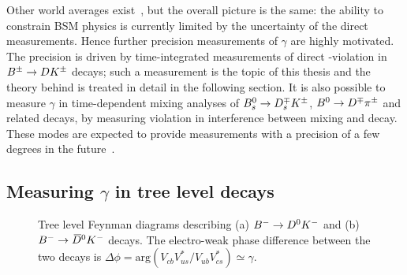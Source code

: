 Other world averages exist~\cite{HFLAV,UTfit-UT}, but the overall picture is the same: the ability to constrain BSM physics is currently limited by the uncertainty of the direct measurements. Hence further precision measurements of $\gamma$ are highly motivated. The precision is driven by time-integrated measurements of direct \CP-violation in ${{B}^\pm}\rightarrow{\ensuremath{D}}{\ensuremath{{K}^\pm}}$ decays; such a measurement is the topic of this thesis and the theory behind is treated in detail in the following section. It is also possible to measure $\gamma$ in time-dependent mixing analyses of ${{B}^0_{s}}\rightarrow{\ensuremath{{D}^{\mp}_{s}}}{\ensuremath{{K}^\pm}}$, ${{B}^0}\rightarrow{\ensuremath{{D}^\mp}}{\ensuremath{{\pi}^\pm}}$ and related decays, by measuring \CP violation in interference between mixing and decay. These modes are expected to provide measurements with a precision of a few degrees in the future~\cite{lhcbcollaborationPhysicsCaseLHCb2019}.





\subsection{\texorpdfstring{Measuring $\gamma$ in tree level decays}{Measuring gamma in tree level decays}} %
\label{sub:_measuring_gamma_in_tree_level_decays}

\begin{figure}[t]
    \centering
        \begin{subfigure}[t]{0.39\textwidth}
        \hspace{0.7cm}
        
        \caption{}
        \end{subfigure}
        \begin{subfigure}[t]{0.39\textwidth}
        \hspace{0.7cm}
        
        \caption{}
        \end{subfigure}
        \caption{Tree level Feynman diagrams describing (a) ${{{{B}^-}}\rightarrow {\ensuremath{{D}^0}} {\ensuremath{{K}^-}}}$ and (b) ${{{{B}^-}}\rightarrow {\ensuremath{{\kern 0.18em\overline{\kern -0.18em D}}{}^0}} {\ensuremath{{K}^-}}}$ decays. The electro-weak phase difference between the two decays is $\Delta\phi = 
\text{arg}\left( {V_{cb}V_{us}^*}/{V_{ub}V_{cs}^*} \right)\simeq\gamma$.}
        \label{fig:feynman_diagrams}
    
\end{figure}

